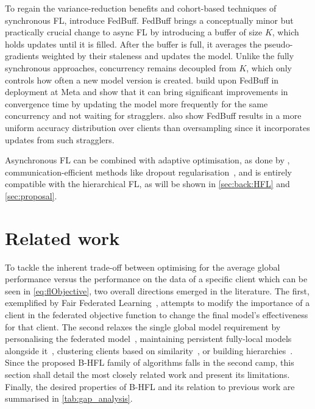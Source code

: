 To regain the variance-reduction benefits and cohort-based techniques of synchronous FL, \citet{FedBuff} introduce FedBuff. FedBuff brings a conceptually minor but practically crucial change to async FL by introducing a buffer of size $K$, which holds updates until it is filled. After the buffer is full, it averages the pseudo-gradients weighted by their staleness and updates the model. Unlike the fully synchronous approaches, concurrency remains decoupled from $K$, which only controls how often a new model version is created. \citet{PAPAYA} build upon FedBuff in deployment at Meta and show that it can bring significant improvements in convergence time by updating the model more frequently for the same concurrency and not waiting for stragglers. \citet{PAPAYA} also show FedBuff results in a more uniform accuracy distribution over clients than oversampling since it incorporates updates from such stragglers.

Asynchronous FL can be combined with adaptive optimisation, as done by \citet{PAPAYA}, communication-efficient methods like dropout regularisation~\citep{AsyncDropout}, and is entirely compatible with the hierarchical FL, as will be shown in \cref{sec:back:HFL} and \cref{sec:proposal}.
\section{Related work}\label{sec:back:related_work}

To tackle the inherent trade-off between optimising for the average global performance versus the performance on the data of a specific client which can be seen in \cref{eq:flObjective}, two overall directions emerged in the literature. The first, exemplified by Fair Federated Learning~\citep{QFedAvg}, attempts to modify the importance of a client in the federated objective function to change the final model's effectiveness for that client. The second relaxes the single global model requirement by personalising the federated model~\citep{SalvagingFL,TowardsPersonalisedFL,FLwithNonIID}, maintaining persistent fully-local models alongside it~\citep{FlWithPersonalisationLayers,AdaptivePersonalisedFederatedLearning,FederatedLearningMixtureOfGlobalAndLocal, Ditto}, clustering clients based on similarity~\citep{ThreeApproachesMansour,AnEfficientFrameworkForClusteredFL,Auxo}, or building hierarchies~\citep{Client-Edge-CloudHierFL,Hier_Het_Cellular,OptimalUserEdgeAssingmentHierFL}. Since the proposed B-HFL family of algorithms falls in the second camp, this section shall detail the most closely related work and present its limitations. Finally, the desired properties of B-HFL and its relation to previous work are summarised in \cref{tab:gap_analysis}.


